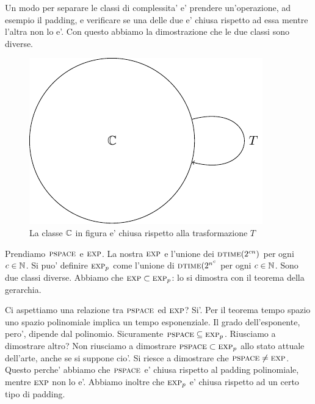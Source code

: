 Un modo per separare le classi di complessita' e' prendere un'operazione, ad esempio il padding, e
verificare se una delle due e' chiusa rispetto ad essa mentre l'altra non lo e'. Con questo abbiamo
la dimostrazione che le due classi sono diverse.

\begin{figure}[h]
    \begin{center}
        \includegraphics{./img/timespacehierarchies/ClosedClass.pdf}    
        \caption{La classe $\mathbb{C}$ in figura e' chiusa rispetto alla trasformazione $T$}
    \end{center}
\end{figure}

Prendiamo $\textsc{pspace}$ e $\textsc{exp}$. La nostra $\textsc{exp}$ e l'unione dei $\textsc{dtime}(2^{cn})$ per ogni $c \in
\mathbb{N}$. Si puo' definire $\textsc{exp}_{p}$ come l'unione di $\textsc{dtime}(2^{n^{c}}$ per ogni $c \in \mathbb{N}$. Sono
due classi diverse. Abbiamo che $\textsc{exp} \subset \textsc{exp}_{p}$: lo si dimostra con il teorema della
gerarchia.

Ci aspettiamo una relazione tra $\textsc{pspace}$ ed $\textsc{exp}$? Si'. Per il teorema tempo spazio uno spazio
polinomiale implica un tempo esponenziale. Il grado dell'esponente, pero', dipende dal polinomio.
Sicuramente $\textsc{pspace} \subseteq \textsc{exp}_{p}$. Riusciamo a dimostrare altro? Non riusciamo a dimostrare
$\textsc{pspace} \subset \textsc{exp}_{p}$ allo stato attuale dell'arte, anche se si suppone cio'. Si riesce a
dimostrare che $\textsc{pspace} \not= \textsc{exp}$. Questo perche' abbiamo che $\textsc{pspace}$ e' chiusa rispetto al
padding polinomiale, mentre $\textsc{exp}$ non lo e'. Abbiamo inoltre che $\textsc{exp}_{p}$ e' chiusa
rispetto ad un certo tipo di padding.

